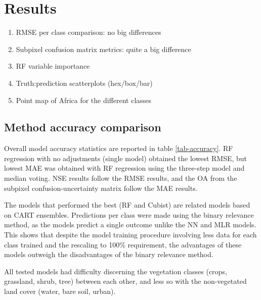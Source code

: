 \documentclass[a4paper,10pt]{article}
\begin{document}
\section{Results}

\begin{enumerate}
 \item RMSE per class comparison: no big differences
 \item Subpixel confusion matrix metrics: quite a big difference
 \item RF variable importance
 \item Truth:prediction scatterplots (hex/box/bar)
 \item Point map of Africa for the different classes
\end{enumerate}

\subsection{Method accuracy comparison}

Overall model accuracy statistics are reported in table \ref{tab-accuracy}.
\Gls{RF} regression with no adjustments (single model) obtained the lowest \gls{RMSE}, but lowest \gls{MAE} was obtained with \gls{RF} regression using the three-step model and median voting.
\gls{NSE} results follow the \gls{RMSE} results, and the \gls{OA} from the subpixel confusion-uncertainty matrix follow the \gls{MAE} results.

The models that performed the best (\gls{RF} and Cubist) are related models based on \gls{CART} ensembles.
Predictions per class were made using the binary relevance method, as the models predict a single outcome unlike the \gls{NN} and \gls{MLR} models.
This shows that despite the model training procedure involving less data for each class trained and the rescaling to 100\% requirement, the advantages of these models outweigh the disadvantages of the binary relevance method.

All tested models had difficulty discerning the vegetation classes (crops, grassland, shrub, tree) between each other, and less so with the non-vegetated land cover (water, bare soil, urban).
\end{document}
